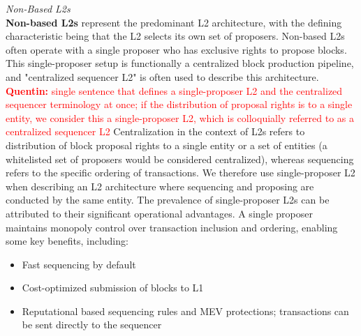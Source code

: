 \documentclass[a4paper]{article}
\theoremstyle{boldstyle}
\newcommand{\qb}[1]{\textcolor{red}{\textbf{Quentin:} #1}}
\begin{document}
    
    \textit{Non-Based L2s} \\
    \textbf{Non-based L2s} represent the predominant L2 architecture, with the defining characteristic being that the L2 selects its own set of proposers. Non-based L2s often operate with a single proposer who has exclusive rights to propose blocks. This single-proposer setup is functionally a centralized block production pipeline, and "centralized sequencer L2" is often used to describe this architecture. 
    \qb{single sentence that defines a single-proposer L2 and the centralized sequencer terminology at once; if the distribution of proposal rights is to a single entity, we consider this a single-proposer L2, which is colloquially referred to as a centralized sequencer L2}
 Centralization in the context of L2s refers to distribution of block proposal rights to a single entity or a set of entities (a whitelisted set of proposers would be considered centralized), whereas sequencing refers to the specific ordering of transactions. We therefore use single-proposer L2 when describing an L2 architecture where sequencing and proposing are conducted by the same entity. The prevalence of single-proposer L2s can be attributed to their significant operational advantages. A single proposer maintains monopoly control over transaction inclusion and ordering, enabling some key benefits, including:
        \begin{itemize}
            \item Fast sequencing by default
            \item Cost-optimized submission of blocks to L1
            \item Reputational based sequencing rules and MEV protections; transactions can be sent directly to the sequencer
        \end{itemize} 

\end{document}
